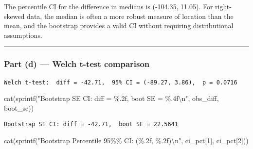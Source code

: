 \documentclass[
  letterpaper,
  DIV=11,
  numbers=noendperiod]{scrartcl}
\newenvironment{Shaded}{\begin{snugshade}}{\end{snugshade}}
\newcommand{\DecValTok}[1]{\textcolor[rgb]{0.68,0.00,0.00}{#1}}
\newcommand{\FunctionTok}[1]{\textcolor[rgb]{0.28,0.35,0.67}{#1}}
\newcommand{\NormalTok}[1]{\textcolor[rgb]{0.00,0.23,0.31}{#1}}
\newcommand{\OtherTok}[1]{\textcolor[rgb]{0.00,0.23,0.31}{#1}}
\newcommand{\SpecialCharTok}[1]{\textcolor[rgb]{0.37,0.37,0.37}{#1}}
\newcommand{\StringTok}[1]{\textcolor[rgb]{0.13,0.47,0.30}{#1}}
\begin{document}
The percentile CI for the difference in medians is (-104.35, 11.05). For
right-skewed data, the median is often a more robust measure of location
than the mean, and the bootstrap provides a valid CI without requiring
distributional assumptions.

\begin{center}\rule{0.5\linewidth}{0.5pt}\end{center}

\subsubsection{Part (d) --- Welch t-test
comparison}\label{part-d-welch-t-test-comparison}

\begin{Shaded}
\end{Shaded}

\begin{verbatim}
Welch t-test:  diff = -42.71,  95% CI = (-89.27, 3.86),  p = 0.0716
\end{verbatim}

\begin{Shaded}
\begin{Highlighting}[]
\FunctionTok{cat}\NormalTok{(}\FunctionTok{sprintf}\NormalTok{(}\StringTok{"Bootstrap SE CI: diff = \%.2f,  boot SE = \%.4f}\SpecialCharTok{\textbackslash{}n}\StringTok{"}\NormalTok{, obs\_diff, boot\_se))}
\end{Highlighting}
\end{Shaded}

\begin{verbatim}
Bootstrap SE CI: diff = -42.71,  boot SE = 22.5641
\end{verbatim}

\begin{Shaded}
\begin{Highlighting}[]
\FunctionTok{cat}\NormalTok{(}\FunctionTok{sprintf}\NormalTok{(}\StringTok{"Bootstrap Percentile 95\%\% CI: (\%.2f, \%.2f)}\SpecialCharTok{\textbackslash{}n}\StringTok{"}\NormalTok{, ci\_pct[}\DecValTok{1}\NormalTok{], ci\_pct[}\DecValTok{2}\NormalTok{]))}
\end{Highlighting}
\end{Shaded}
\end{document}
